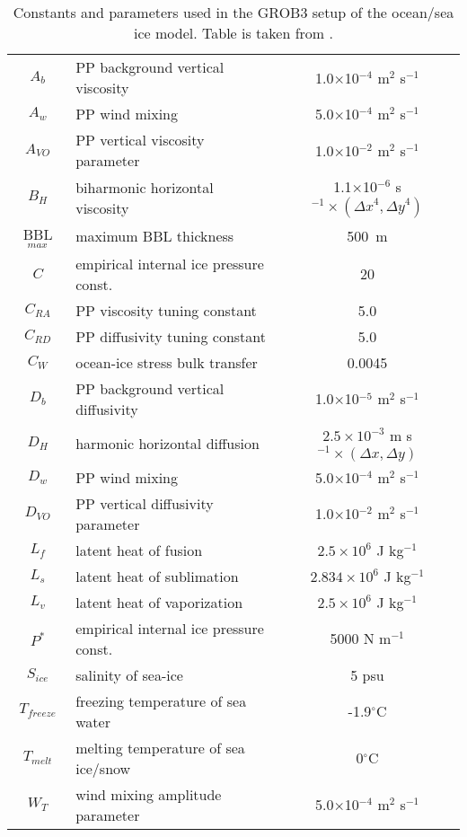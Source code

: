 \begin{table}[!bh]
\begin{footnotesize}
{{\begin{tabular}{|c|l|c|}
$A_b$ & PP background vertical viscosity & 1.0$\times$10$^{-4}$ m$^2$ s$^{-1}$ \\
$A_w$ & PP wind mixing & 5.0$\times$10$^{-4}$ m$^2$ s$^{-1}$  \\
$A_{\mathit{VO}}$ & PP vertical viscosity parameter & 1.0$\times$10$^{-2}$ m$^2$ s$^{-1}$ \\
$B_H$ & biharmonic horizontal viscosity & 1.1$\times$10$^{-6}$ s$^{-1}\times({\Delta x}^4,{\Delta y}^4)$ \\
BBL$_{max}$ & maximum BBL thickness & 500~m \\
$C$ & empirical internal ice pressure const. & 20 \\
$C_{RA}$ & PP viscosity tuning constant & 5.0 \\
$C_{RD}$ & PP diffusivity tuning constant & 5.0 \\
$C_W$ & ocean-ice stress bulk transfer & 0.0045 \\
$D_b$ & PP background vertical diffusivity & 1.0$\times$10$^{-5}$ m$^2$ s$^{-1}$ \\
$D_H$ & harmonic horizontal diffusion & $2.5\times10^{-3}$ m s$^{-1}\times(\Delta x, \Delta y)$ \\
$D_w$ & PP wind mixing & 5.0$\times$10$^{-4}$ m$^2$ s$^{-1}$  \\
$D_{\mathit{VO}}$ & PP vertical diffusivity parameter & 1.0$\times$10$^{-2}$ m$^2$ s$^{-1}$ \\
$L_f$ & latent heat of fusion & $2.5\times10^6$ J kg$^{-1}$ \\
$L_s$ & latent heat of sublimation & $2.834\times10^6$ J kg$^{-1}$ \\
$L_v$ & latent heat of vaporization &$2.5\times10^6$ J kg$^{-1}$ \\
$P^*$ & empirical internal ice pressure const.  & 5000 N m$^{-1}$ \\
$S_{\mathit{ice}}$ & salinity of sea-ice & 5 psu \\
$T_{\mathit{freeze}}$ & freezing temperature of sea water & -1.9$^{\circ}$C \\
$T_{\mathit{melt}}$ & melting temperature of sea ice/snow & 0$^{\circ}$C \\
$W_{T}$ & wind mixing amplitude parameter &  5.0$\times$10$^{-4}$ m$^2$ s$^{-1}$ \\
\hline
\end{tabular}}}
\caption{Constants and parameters used in the GROB3 setup of the ocean/sea ice
model. Table is taken from \citet{Haak:2004}.}
\end{footnotesize}
\end{table}






